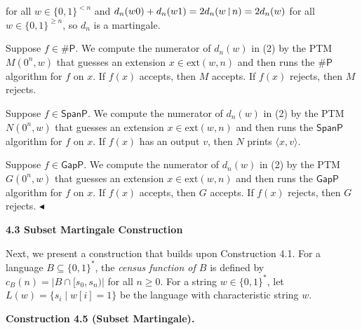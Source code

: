 for all $w\in\{0,1\}^{<n}$ and $d_{n}(w0)+d_{n}(w1)=2d_{n}(w\negthinspace\upharpoonright\negthinspace n)=2d_{n}(w)$ for all $w\in\{0,1\}^{\geq n}$, so $d_{n}$ is a martingale.\par




Suppose $f\in{\mathsf{\#}\mathsf{P}}$. We compute the numerator of $d_{n}(w)$ in (2) by the PTM $M(0^{n},w)$ that guesses an extension $x\in\mathrm{ext}(w,n)$ and then runs the ${\mathsf{\#}\mathsf{P}}$ algorithm for $f$ on $x$. If $f(x)$ accepts, then $M$ accepts. If $f(x)$ rejects, then $M$ rejects.\par




Suppose $f\in\mathsf{SpanP}$. We compute the numerator of $d_{n}(w)$ in (2) by the PTM $N(0^{n},w)$ that guesses an extension $x\in\mathrm{ext}(w,n)$ and then runs the $\mathsf{SpanP}$ algorithm for $f$ on $x$. If $f(x)$ has an output $v$, then $N$ prints $\langle x,v\rangle$.\par




Suppose $f\in\mathsf{GapP}$. We compute the numerator of $d_{n}(w)$ in (2) by the PTM $G(0^{n},w)$ that guesses an extension $x\in\mathrm{ext}(w,n)$ and then runs the $\mathsf{GapP}$ algorithm for $f$ on $x$. If $f(x)$ accepts, then $G$ accepts. If $f(x)$ rejects, then $G$ rejects.
$\blacktriangleleft$\par






\par\medskip\noindent\textbf{
4.3 Subset Martingale Construction}\par




Next, we present a construction that builds upon Construction 4.1.
For a language $B\subseteq\{0,1\}^{*}$, the \emph{census function of $B$} is defined by $c_{B}(n)=|B\cap[s_{0},s_{n})|$ for all $n\geq 0$. For a string $w\in\{0,1\}^{*}$, let $L(w)=\{s_{i}\mid w[i]=1\}$ be the language with characteristic string $w$.\par





\par\medskip\noindent\textbf{
\textbf{Construction 4.5}\textbf{ }(Subset Martingale)\textbf{.}
}\par



